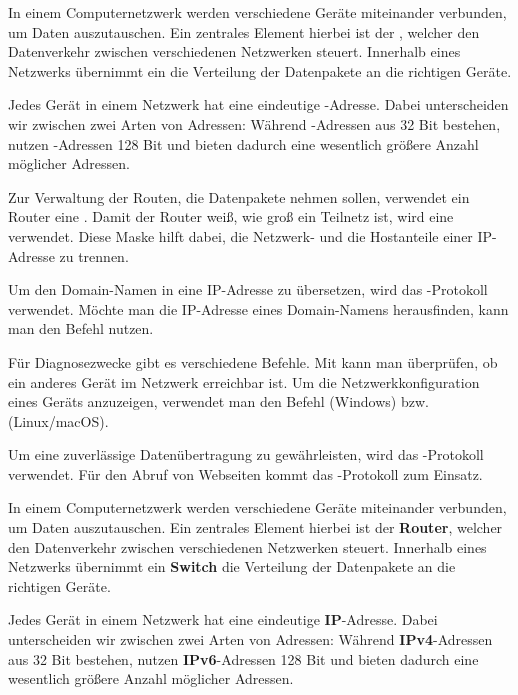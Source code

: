 \begin{myexercise}

    In einem Computernetzwerk werden verschiedene Geräte miteinander verbunden, um Daten auszutauschen. Ein zentrales Element hierbei ist der , welcher den Datenverkehr zwischen verschiedenen Netzwerken steuert. Innerhalb eines Netzwerks übernimmt ein  die Verteilung der Datenpakete an die richtigen Geräte.

    Jedes Gerät in einem Netzwerk hat eine eindeutige -Adresse. Dabei unterscheiden wir zwischen zwei Arten von Adressen: Während -Adressen aus 32 Bit bestehen, nutzen -Adressen 128 Bit und bieten dadurch eine wesentlich größere Anzahl möglicher Adressen.

    Zur Verwaltung der Routen, die Datenpakete nehmen sollen, verwendet ein Router eine . Damit der Router weiß, wie groß ein Teilnetz ist, wird eine  verwendet. Diese Maske hilft dabei, die Netzwerk- und die Hostanteile einer IP-Adresse zu trennen.

    Um den Domain-Namen in eine IP-Adresse zu übersetzen, wird das -Protokoll verwendet. Möchte man die IP-Adresse eines Domain-Namens herausfinden, kann man den Befehl  nutzen.

    Für Diagnosezwecke gibt es verschiedene Befehle. Mit  kann man überprüfen, ob ein anderes Gerät im Netzwerk erreichbar ist. Um die Netzwerkkonfiguration eines Geräts anzuzeigen, verwendet man den Befehl  (Windows) bzw.  (Linux/macOS).

    Um eine zuverlässige Datenübertragung zu gewährleisten, wird das -Protokoll verwendet. Für den Abruf von Webseiten kommt das -Protokoll zum Einsatz.

    \begin{myanswer}
        In einem Computernetzwerk werden verschiedene Geräte miteinander verbunden, um Daten auszutauschen. Ein zentrales Element hierbei ist der \textbf{Router}, welcher den Datenverkehr zwischen verschiedenen Netzwerken steuert. Innerhalb eines Netzwerks übernimmt ein \textbf{Switch} die Verteilung der Datenpakete an die richtigen Geräte.

        Jedes Gerät in einem Netzwerk hat eine eindeutige \textbf{IP}-Adresse. Dabei unterscheiden wir zwischen zwei Arten von Adressen: Während \textbf{IPv4}-Adressen aus 32 Bit bestehen, nutzen \textbf{IPv6}-Adressen 128 Bit und bieten dadurch eine wesentlich größere Anzahl möglicher Adressen.


\end{myanswer}
\end{myexercise}
